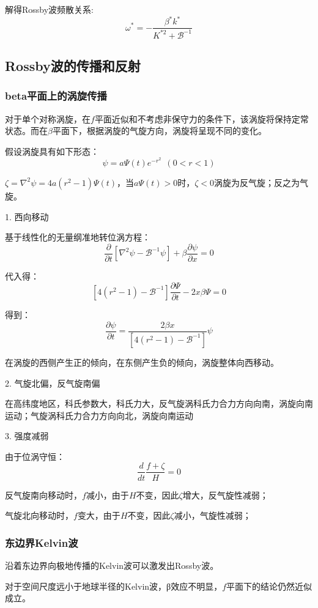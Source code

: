 \documentclass{article}
\begin{document}
解得Rossby波频散关系:
$$\omega^*=-\frac{\beta^*k^*}{K^{*2}+\mathcal{B}^{-1}}$$

\subsection{Rossby波的传播和反射}

\subsubsection{beta平面上的涡旋传播}
对于单个对称涡旋，在$f$平面近似和不考虑非保守力的条件下，该涡旋将保持定常状态。而在$\beta$平面下，根据涡旋的气旋方向，涡旋将呈现不同的变化。

假设涡旋具有如下形态：
$$\psi = a\Psi(t)e^{-r^2} \ \ (0<r<1)$$

$\zeta={{\nabla }}^{2}{{\psi }} = 4a(r^2-1)\Psi(t)$，当$a\Psi(t)>0$时，$\zeta<0$涡旋为反气旋；反之为气旋。

1. 西向移动

基于线性化的无量纲准地转位涡方程：
$$\frac{\partial }{\partial {{t}}}\left[ {{\nabla }}^{2}{{\psi }}-{\mathcal{B}^{-1}}{{\psi }} \right]+{{\beta }}\frac{\partial {{\psi }}}{\partial {{x}}}=0$$

代入得：
$$\left[ 4({{r}^{2}}-1)-{{\mathcal{B}}^{-1}} \right]\frac{\partial \Psi }{\partial t}-2x\beta \Psi =0$$

得到：
$$\frac{\partial \psi }{\partial t}=\frac{2\beta x}{\left[ 4({{r}^{2}}-1)-{{\mathcal{B}}^{-1}} \right]}\psi$$

在涡旋的西侧产生正的倾向，在东侧产生负的倾向，涡旋整体向西移动。

2. 气旋北偏，反气旋南偏 

在高纬度地区，科氏参数大，科氏力大，反气旋涡科氏力合力方向向南，涡旋向南运动；气旋涡科氏力合力方向向北，涡旋向南运动

3. 强度减弱

由于位涡守恒：
$$\frac{d}{dt}\frac{f+\zeta}{H}=0$$

反气旋南向移动时，$f$减小，由于$H$不变，因此$\zeta$增大，反气旋性减弱；

气旋北向移动时，$f$变大，由于$H$不变，因此$\zeta$减小，气旋性减弱；

\subsubsection{东边界Kelvin波}
沿着东边界向极地传播的Kelvin波可以激发出Rossby波。

对于空间尺度远小于地球半径的Kelvin波，β效应不明显，$f$平面下的结论仍然近似成立。
\end{document}
